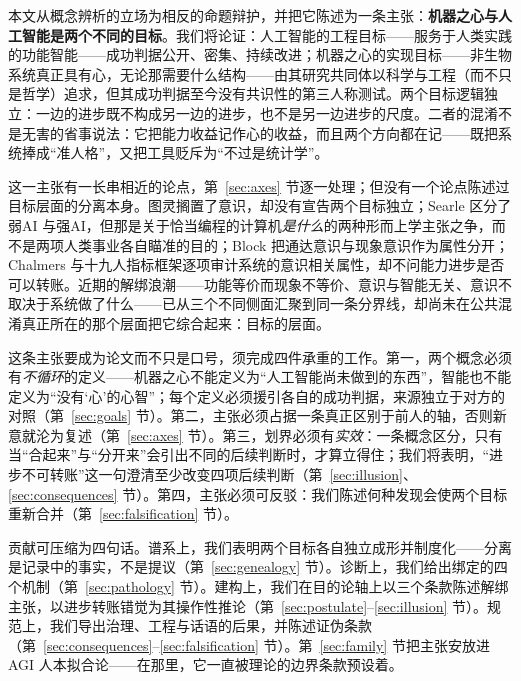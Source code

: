 \documentclass[10pt,fontset=fandol]{ctexart}
\begin{document}
本文从概念辨析的立场为相反的命题辩护，并把它陈述为一条主张：\textbf{机器之心与人工智能是两个不同的目标}。我们将论证：人工智能的工程目标——服务于人类实践的功能智能——成功判据公开、密集、持续改进；机器之心的实现目标——非生物系统真正具有心，无论那需要什么结构——由其研究共同体以科学与工程（而不只是哲学）追求，但其成功判据至今没有共识性的第三人称测试。两个目标逻辑独立：一边的进步既不构成另一边的进步，也不是另一边进步的尺度。二者的混淆不是无害的省事说法：它把能力收益记作心的收益，而且两个方向都在记——既把系统捧成“准人格”，又把工具贬斥为“不过是统计学”。

这一主张有一长串相近的论点，第~\ref{sec:axes} 节逐一处理；但没有一个论点陈述过目标层面的分离本身。图灵搁置了意识，却没有宣告两个目标独立\cite{turing1950}；Searle 区分了弱AI 与强AI，但那是关于恰当编程的计算机\emph{是什么}的两种形而上学主张之争，而不是两项人类事业各自瞄准的目的\cite{searle1980}；Block 把通达意识与现象意识作为属性分开\cite{block1995}；Chalmers 与十九人指标框架逐项审计系统的意识相关属性，却不问能力进步是否可以转账\cite{chalmers2023llm,butlin2023consciousness}。近期的解绑浪潮——功能等价而现象不等价\cite{findlay2024dissociating}、意识与智能无关\cite{pesonen2026notobstacles}、意识不取决于系统做了什么\cite{seth2025conscious}——已从三个不同侧面汇聚到同一条分界线，却尚未在公共混淆真正所在的那个层面把它综合起来：目标的层面。

这条主张要成为论文而不只是口号，须完成四件承重的工作。第一，两个概念必须有\emph{不循环}的定义——机器之心不能定义为“人工智能尚未做到的东西”，智能也不能定义为“没有‘心’的心智”；每个定义必须援引各自的成功判据，来源独立于对方的对照（第~\ref{sec:goals} 节）。第二，主张必须占据一条真正区别于前人的轴，否则新意就沦为复述（第~\ref{sec:axes} 节）。第三，划界必须有\emph{实效}：一条概念区分，只有当“合起来”与“分开来”会引出不同的后续判断时，才算立得住；我们将表明，“进步不可转账”这一句澄清至少改变四项后续判断（第~\ref{sec:illusion}、\ref{sec:consequences} 节）。第四，主张必须可反驳：我们陈述何种发现会使两个目标重新合并（第~\ref{sec:falsification} 节）。

贡献可压缩为四句话。谱系上，我们表明两个目标各自独立成形并制度化——分离是记录中的事实，不是提议（第~\ref{sec:genealogy} 节）。诊断上，我们给出绑定的四个机制（第~\ref{sec:pathology} 节）。建构上，我们在目的论轴上以三个条款陈述解绑主张，以进步转账错觉为其操作性推论（第~\ref{sec:postulate}--\ref{sec:illusion} 节）。规范上，我们导出治理、工程与话语的后果，并陈述证伪条款（第~\ref{sec:consequences}--\ref{sec:falsification} 节）。第~\ref{sec:family} 节把主张安放进 AGI 人本拟合论——在那里，它一直被理论的边界条款预设着\cite{yu2026fitting}。
\end{document}
